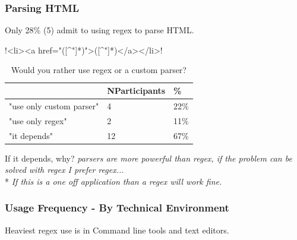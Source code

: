 \begin{frame}[fragile]
\frametitle{Parsing HTML}
\begin{center}
Only 28\% (5) admit to using regex to parse HTML.
\end{center}
\begin{center}
\cverb!<li><a href="([^"]*)">([^"]*)</a></li>!
\end{center}
\begin{table}
\begin{tabular}{l l l}
\toprule
& \textbf{NParticipants} & \textbf{\%} \\
\midrule
"use only custom parser" & 4 & 22\% \\
"use only regex" & 2 & 11\% \\
"it depends" & 12 & 67\% \\
\bottomrule
\end{tabular}
\caption{Would you rather use regex or a custom parser?  }
\begin{block}{If it depends, why?}
\emph{parsers are more powerful than regex, if the problem can be solved with regex I prefer regex...}
\\* \emph{If this is a one off application than a regex will work fine.}
\end{block}
\end{table}

\end{frame}


\begin{frame}
\frametitle{Usage Frequency - By Technical Environment}
\begin{center}
Heaviest regex use is in Command line tools and text editors.
\end{center}

\end{frame}



